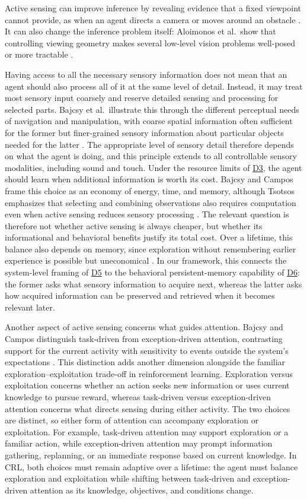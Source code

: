 \documentclass[10pt,journal,compsoc]{IEEEtran}
\DeclareRobustCommand{\Dref}[1]{\hyperref[sec:d#1]{D#1}}
\begin{document}
Active sensing can improve inference by revealing evidence that a fixed viewpoint cannot provide, as when an agent directs a camera or moves around an obstacle \cite{bajcsy2018}.
It can also change the inference problem itself: Aloimonos et al.\ show that controlling viewing geometry makes several low-level vision problems well-posed or more tractable \cite{aloimonos1988}.

Having access to all the necessary sensory information does not mean that an agent should also process all of it at the same level of detail.
Instead, it may treat most sensory input coarsely and reserve detailed sensing and processing for selected parts.
Bajcsy et al.\ illustrate this through the different perceptual needs of navigation and manipulation, with coarse spatial information often sufficient for the former but finer-grained sensory information about particular objects needed for the latter \cite{bajcsy2018}.
The appropriate level of sensory detail therefore depends on what the agent is doing, and this principle extends to all controllable sensory modalities, including sound and touch.
Under the resource limits of \Dref{3}, the agent should learn when additional information is worth its cost.
Bajcsy and Campos frame this choice as an economy of energy, time, and memory, although Tsotsos emphasizes that selecting and combining observations also requires computation even when active sensing reduces sensory processing \cite{tsotsos1992}.
The relevant question is therefore not whether active sensing is always cheaper, but whether its informational and behavioral benefits justify its total cost.
Over a lifetime, this balance also depends on memory, since exploration without remembering earlier experience is possible but uneconomical \cite{bajcsy1992}.
In our framework, this connects the system-level framing of \Dref{5} to the behavioral persistent-memory capability of \Dref{6}: the former asks what sensory information to acquire next, whereas the latter asks how acquired information can be preserved and retrieved when it becomes relevant later.

Another aspect of active sensing concerns what guides attention.
Bajcsy and Campos distinguish task-driven from exception-driven attention, contrasting support for the current activity with sensitivity to events outside the system's expectations \cite{bajcsy1992}.
This distinction adds another dimension alongside the familiar exploration--exploitation trade-off in reinforcement learning.
Exploration versus exploitation concerns whether an action seeks new information or uses current knowledge to pursue reward, whereas task-driven versus exception-driven attention concerns what directs sensing during either activity.
The two choices are distinct, so either form of attention can accompany exploration or exploitation.
For example, task-driven attention may support exploration or a familiar action, while exception-driven attention may prompt information gathering, replanning, or an immediate response based on current knowledge.
In CRL, both choices must remain adaptive over a lifetime: the agent must balance exploration and exploitation while shifting between task-driven and exception-driven attention as its knowledge, objectives, and conditions change.
\end{document}
